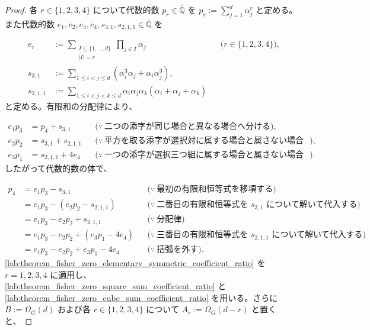 \documentclass[11pt,a4paper]{article}
\theoremstyle{remark}
\begin{document}
\begin{proof}
各
$r\in\{1,2,3,4\}$
について代数的数
$p_r\in\overline{\mathbb Q}$
を
$p_r:=\sum_{j=1}^{d}\alpha_j^r$
と定める。また代数的数
$e_1,e_2,e_3,e_4,s_{3,1},s_{2,1,1}\in\overline{\mathbb Q}$
を

\[\begin{aligned}
e_r
&:=
\sum_{\substack{I\subseteq\{1,\ldots,d\}\\|I|=r}}
\prod_{j\in I}\alpha_j
&&\bigl(r\in\{1,2,3,4\}\bigr),\\
s_{3,1}
&:=
\sum_{1\le i<j\le d}
\left(\alpha_i^3\alpha_j+\alpha_i\alpha_j^3\right),\\
s_{2,1,1}
&:=
\sum_{1\le i<j<k\le d}
\alpha_i\alpha_j\alpha_k
\left(\alpha_i+\alpha_j+\alpha_k\right)
\end{aligned}\]
と定める。有限和の分配律により、

\[\begin{aligned}
e_1p_3
&=p_4+s_{3,1}
&&\bigl(\because\ \text{二つの添字が同じ場合と異なる場合へ分ける}\bigr),\\
e_2p_2
&=s_{3,1}+s_{2,1,1}
&&\bigl(\because\ \text{平方を取る添字が選択対に属する場合と属さない場合へ分ける}\bigr),\\
e_3p_1
&=s_{2,1,1}+4e_4
&&\bigl(\because\ \text{一つの添字が選択三つ組に属する場合と属さない場合へ分ける}\bigr).
\end{aligned}\]
したがって代数的数の体で、

\[\begin{aligned}
p_4
&=e_1p_3-s_{3,1}
&&\bigl(\because\ \text{最初の有限和恒等式を移項する}\bigr)\\
&=e_1p_3-\left(e_2p_2-s_{2,1,1}\right)
&&\bigl(\because\ \text{二番目の有限和恒等式を }s_{3,1}\text{ について解いて代入する}\bigr)\\
&=e_1p_3-e_2p_2+s_{2,1,1}
&&\bigl(\because\ \text{分配律}\bigr)\\
&=e_1p_3-e_2p_2+\left(e_3p_1-4e_4\right)
&&\bigl(\because\ \text{三番目の有限和恒等式を }s_{2,1,1}\text{ について解いて代入する}\bigr)\\
&=e_1p_3-e_2p_2+e_3p_1-4e_4
&&\bigl(\because\ \text{括弧を外す}\bigr).
\end{aligned}\]
\cref{lab:theorem_fisher_zero_elementary_symmetric_coefficient_ratio}
 を
$r=1,2,3,4$
 に適用し、
\cref{lab:theorem_fisher_zero_square_sum_coefficient_ratio}
 と
\cref{lab:theorem_fisher_zero_cube_sum_coefficient_ratio}
 を用いる。さらに
$B:=\Omega_G(d)$
 および各
$r\in\{1,2,3,4\}$
について
$A_r:=\Omega_G(d-r)$
と置くと、


\end{proof}
\end{document}

